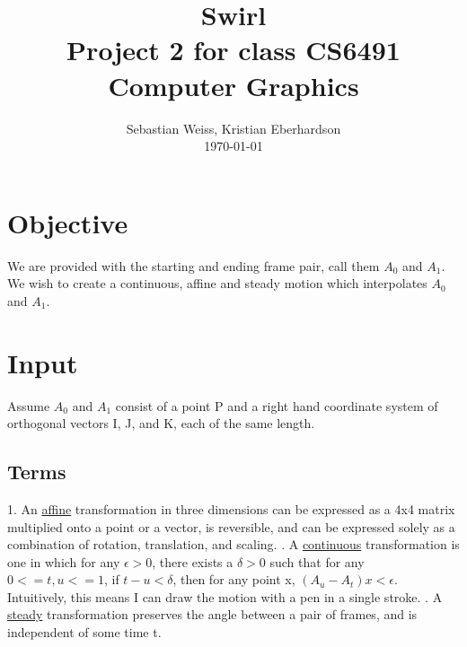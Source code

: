 \documentclass[journal, letterpaper]{IEEEtran}
\begin{document}
\title{Swirl \\
	{\large Project 2 for class CS6491 Computer Graphics}}
\author{Sebastian Weiss, Kristian Eberhardson\\ \today}

\maketitle


\section{Objective}
We are provided with the starting and ending frame pair, call them $A_0$ and $A_1$.  We wish to create a continuous, affine and steady motion which interpolates $A_0$ and $A_1$.
 
\section{Input}
Assume $A_0$ and $A_1$ consist of a point P and a right hand coordinate system of orthogonal vectors I, J, and K, each of the same length.
\subsection{Terms} 
1. An \underline{affine} transformation in three dimensions can be expressed as a 4x4 matrix multiplied onto a point or a vector, is reversible, and can be expressed solely as a combination of rotation, translation, and scaling.
. A \underline{continuous} transformation is one in which for any $\epsilon > 0$, there exists a $\delta > 0$ such that for any $0 <= t, u <= 1$, if $t - u < \delta$, then for any point x, $(A_u - A_t)x < \epsilon$.  Intuitively, this means I can draw the motion with a pen in a single stroke.
. A \underline{steady} transformation preserves the angle between a pair of frames, and is independent of some time t. 
\end{document}
